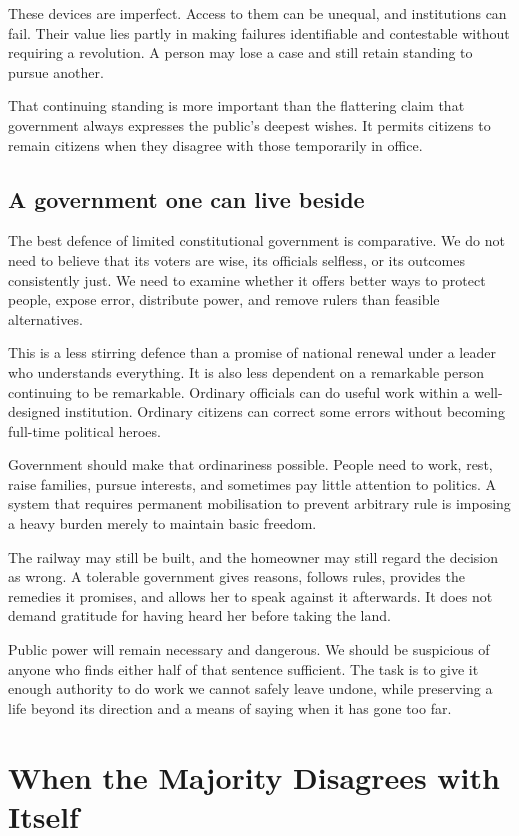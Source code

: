 \documentclass[12pt,a4paper]{book}
\begin{document}
These devices are imperfect. Access to them can be unequal, and institutions can fail. Their value lies partly in making failures identifiable and contestable without requiring a revolution. A person may lose a case and still retain standing to pursue another.

That continuing standing is more important than the flattering claim that government always expresses the public's deepest wishes. It permits citizens to remain citizens when they disagree with those temporarily in office.

\section*{A government one can live beside}

The best defence of limited constitutional government is comparative. We do not need to believe that its voters are wise, its officials selfless, or its outcomes consistently just. We need to examine whether it offers better ways to protect people, expose error, distribute power, and remove rulers than feasible alternatives.

This is a less stirring defence than a promise of national renewal under a leader who understands everything. It is also less dependent on a remarkable person continuing to be remarkable. Ordinary officials can do useful work within a well-designed institution. Ordinary citizens can correct some errors without becoming full-time political heroes.

Government should make that ordinariness possible. People need to work, rest, raise families, pursue interests, and sometimes pay little attention to politics. A system that requires permanent mobilisation to prevent arbitrary rule is imposing a heavy burden merely to maintain basic freedom.

The railway may still be built, and the homeowner may still regard the decision as wrong. A tolerable government gives reasons, follows rules, provides the remedies it promises, and allows her to speak against it afterwards. It does not demand gratitude for having heard her before taking the land.

Public power will remain necessary and dangerous. We should be suspicious of anyone who finds either half of that sentence sufficient. The task is to give it enough authority to do work we cannot safely leave undone, while preserving a life beyond its direction and a means of saying when it has gone too far.

\chapter{When the Majority Disagrees with Itself}
\end{document}
